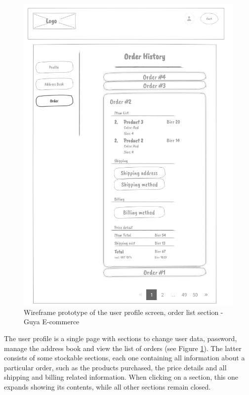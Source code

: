 \begin{figure}[!h]
\center
\includegraphics[keepaspectratio, width=15cm]{wireframes/orderlist.png}
\caption{Wireframe prototype of the user profile screen, order list section - Guya E-commerce}
\label{order-list}
\end{figure}
\clearpage

The user profile is a single page with sections to change user data, password, manage the address book and view the list of orders (see Figure \ref{order-list}). The latter consists of some stockable sections, each one containing all information about a particular order, such as the products purchased, the price details and all shipping and billing related information. When clicking on a section, this one expands showing its contents, while all other sections remain closed.

